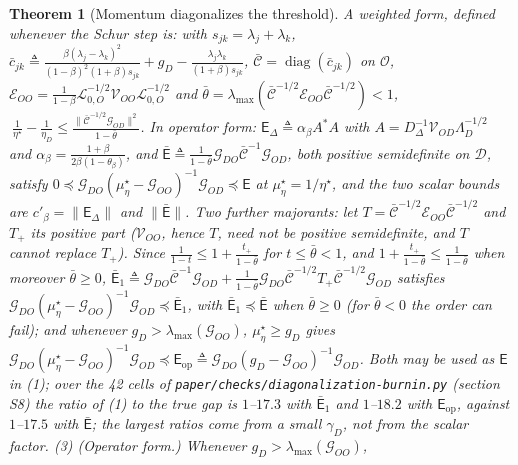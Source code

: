 \documentclass[11pt]{article}
\newtheorem{theorem}{Theorem}
\theoremstyle{remark}
\begin{document}
\begin{theorem}[Momentum diagonalizes the threshold]
A weighted form, defined whenever the Schur step is: with $s_{jk}=\lambda_j+\lambda_k$, $\bar c_{jk}\triangleq\frac{\beta(\lambda_j-\lambda_k)^2}{(1-\beta)^2(1+\beta)s_{jk}}+g_D-\frac{\lambda_j\lambda_k}{(1+\beta)s_{jk}}$, $\bar{\mathcal C}=\operatorname{diag}(\bar c_{jk})$ on $\mathcal O$, $\mathcal E_{OO}=\frac1{1-\beta}\mathcal L_{0,O}^{-1/2}\mathcal V_{OO}\mathcal L_{0,O}^{-1/2}$ and $\bar\theta=\lambda_{\max}(\bar{\mathcal C}^{-1/2}\mathcal E_{OO}\bar{\mathcal C}^{-1/2})<1$, $\ \frac1{\eta^\star}-\frac1{\eta_D}\le\frac{\|\bar{\mathcal C}^{-1/2}\mathcal G_{OD}\|^2}{1-\bar\theta}$. In operator form: $\mathsf E_\Delta\triangleq\alpha_\beta A^*A$ with $A=D_\Delta^{-1}\mathcal V_{OD}\Lambda_D^{-1/2}$ and $\alpha_\beta=\frac{1+\beta}{2\beta(1-\theta_\beta)}$, and $\bar{\mathsf E}\triangleq\frac1{1-\bar\theta}\mathcal G_{DO}\bar{\mathcal C}^{-1}\mathcal G_{OD}$, both positive semidefinite on $\mathcal D$, satisfy $0\preceq\mathcal G_{DO}(\mu^\star_\eta-\mathcal G_{OO})^{-1}\mathcal G_{OD}\preceq\mathsf E$ at $\mu^\star_\eta=1/\eta^\star$, and the two scalar bounds are $c'_\beta=\|\mathsf E_\Delta\|$ and $\|\bar{\mathsf E}\|$. Two further majorants: let $T=\bar{\mathcal C}^{-1/2}\mathcal E_{OO}\bar{\mathcal C}^{-1/2}$ and $T_+$ its positive part ($\mathcal V_{OO}$, hence $T$, need not be positive semidefinite, and $T$ cannot replace $T_+$). Since $\frac1{1-t}\le1+\frac{t_+}{1-\bar\theta}$ for $t\le\bar\theta<1$, and $1+\frac{t_+}{1-\bar\theta}\le\frac1{1-\bar\theta}$ when moreover $\bar\theta\ge0$, $\bar{\mathsf E}_1\triangleq\mathcal G_{DO}\bar{\mathcal C}^{-1}\mathcal G_{OD}+\frac1{1-\bar\theta}\mathcal G_{DO}\bar{\mathcal C}^{-1/2}T_+\bar{\mathcal C}^{-1/2}\mathcal G_{OD}$ satisfies $\mathcal G_{DO}(\mu^\star_\eta-\mathcal G_{OO})^{-1}\mathcal G_{OD}\preceq\bar{\mathsf E}_1$, with $\bar{\mathsf E}_1\preceq\bar{\mathsf E}$ when $\bar\theta\ge0$ (for $\bar\theta<0$ the order can fail); and whenever $g_D>\lambda_{\max}(\mathcal G_{OO})$, $\mu^\star_\eta\ge g_D$ gives $\mathcal G_{DO}(\mu^\star_\eta-\mathcal G_{OO})^{-1}\mathcal G_{OD}\preceq\mathsf E_{\mathrm{op}}\triangleq\mathcal G_{DO}(g_D-\mathcal G_{OO})^{-1}\mathcal G_{OD}$. Both may be used as $\mathsf E$ in (1); over the 42 cells of \texttt{paper/checks/diagonalization-burnin.py} (section S8) the ratio of (1) to the true gap is $1$--$17.3$ with $\bar{\mathsf E}_1$ and $1$--$18.2$ with $\mathsf E_{\mathrm{op}}$, against $1$--$17.5$ with $\bar{\mathsf E}$; the largest ratios come from a small $\gamma_D$, not from the scalar factor.
(3) (Operator form.) Whenever $g_D>\lambda_{\max}(\mathcal G_{OO})$,
\[
\]
\end{theorem}
\end{document}
